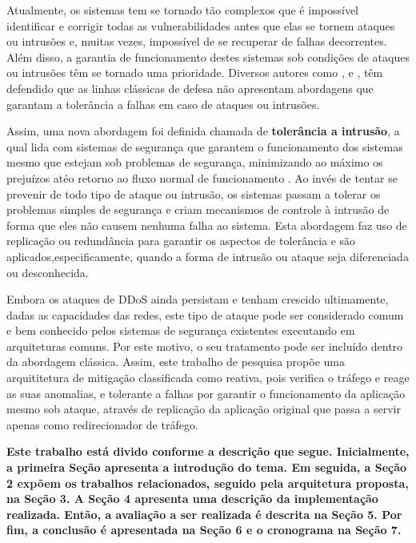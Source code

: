 Atualmente, os sistemas tem se tornado tão complexos que é impossível identificar e corrigir todas as vulnerabilidades antes que elas se tornem ataques ou intrusões e, muitas vezes, impossível de se recuperar de falhas decorrentes. Além disso, a garantia de funcionamento destes sistemas sob condições de ataques ou intrusões têm se tornado uma prioridade. Diversos autores como \cite{Verissimo},
 \cite{4796927} e \cite{1424871}, têm defendido que as linhas clássicas de defesa não apresentam abordagens que garantam a tolerância a falhas em caso de ataques ou intrusões.
  
 Assim, uma nova abordagem foi definida chamada de \textbf{tolerância a intrusão}, a qual lida com sistemas de segurança que garantem o funcionamento dos sistemas mesmo que estejam sob problemas de segurança, minimizando ao máximo os prejuízos atéo retorno ao fluxo normal de funcionamento \cite{Fraga_Powell_1985}. Ao invés de tentar se prevenir de todo tipo de ataque ou intrusão, os sistemas passam a tolerar os problemas simples de segurança e criam mecanismos de controle à intrusão  de forma que eles não causem nenhuma falha ao sistema. Esta abordagem faz uso de replicação ou redundância para garantir os aspectos de tolerância e são aplicados,especificamente, quando a forma de intrusão ou ataque seja diferenciada ou desconhecida. 

Embora os ataques de DDoS ainda persistam e tenham crescido ultimamente, dadas as capacidades das redes, este tipo de ataque pode ser considerado comum e bem conhecido pelos sistemas de segurança existentes executando em arquiteturas comuns. Por este motivo, o seu tratamento pode ser incluído dentro da abordagem clássica. Assim, este trabalho de pesquisa propõe uma arquititetura de mitigação classificada como reativa, pois verifica o tráfego e reage as suas anomalias, e tolerante a falhas por garantir o funcionamento da aplicação mesmo sob ataque, através de replicação da aplicação original que passa a servir apenas como redirecionador de tráfego.

\textbf{
Este trabalho está divido conforme a descrição que segue. Inicialmente,  
a primeira Seção apresenta a introdução do tema. Em seguida, a Seção 2 expõem os trabalhos relacionados, seguido pela arquitetura proposta, na Seção 3. A Seção 4 apresenta uma descrição da implementação realizada. Então, a avaliação a ser realizada é descrita na Seção 5. Por fim, a conclusão é apresentada na Seção 6 e o cronograma na Seção 7.
}
